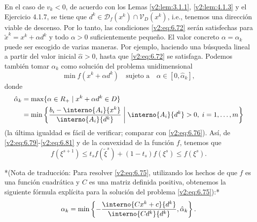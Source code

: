 En el caso de $v_k < 0$, de acuerdo con los Lemas \ref{v2:lem:3.1.1}, \ref{v2:lem:4.1.3} y el Ejercicio 4.1.7, se tiene que $d^k \in \mathcal{D}_f(x^k) \cap \mathcal{V}_D(x^k)$, i.e., tenemos una dirección viable de descenso. Por lo tanto, las condiciones \eqref{v2:eq:6.72} serán satisfechas para $\tilde{x}^k = x^k + \alpha d^k$ y todo $\alpha > 0$ suficientemente pequeño. El valor concreto $\alpha = \alpha_k$ puede ser escogido de varias maneras. Por ejemplo, haciendo una búsqueda lineal a partir del valor inicial $\hat{\alpha} > 0$, hasta que \eqref{v2:eq:6.72} se satisfaga. Podemos también tomar $\alpha_k$ como solución del problema unidimensional
\begin{equation}
    \min f(x^k + \alpha d^k) \quad \text{sujeto a} \quad \alpha \in [0, \hat{\alpha}_k],
    \label{v2:eq:6.75}
\end{equation}
donde
\begin{align}
    \hat{\alpha}_k &= \max \{ \alpha \in \R_+ \mid x^k + \alpha d^k \in D \} \nonumber \\
    &= \min \left\{ \frac{b_i - \interno{A_i}{x^k}}{\interno{A_i}{d^k}} \;\middle|\; \interno{A_i}{d^k} > 0, \; i = 1, \dots, m \right\}
    \label{v2:eq:6.76}
\end{align}
(la última igualdad es fácil de verificar; comparar con \eqref{v2:eq:6.76}). Así, de \eqref{v2:eq:6.79}-\eqref{v2:eq:6.81} y de la convexidad de la función $f$, tenemos que
\[
    f(\xi^{s+1}) \le t_s f(\tilde{\xi}^s) + (1 - t_s) f(\xi^s) \le f(\xi^s).
\]

*(Nota de traducción: Para resolver \eqref{v2:eq:6.75}, utilizando los hechos de que $f$ es una función cuadrática y $C$ es una matriz definida positiva, obtenemos la siguiente fórmula explícita para la solución del problema \eqref{v2:eq:6.75}):*
\[
    \alpha_k = \min \left\{ - \frac{\interno{Cx^k + c}{d^k}}{\interno{Cd^k}{d^k}}, \hat{\alpha}_k \right\}.
\]

